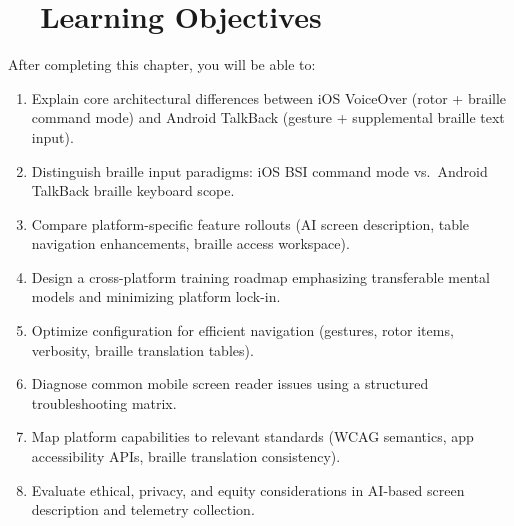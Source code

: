 \section{~~Learning Objectives}
\label{sec:sr26-learning-objectives}
After completing this chapter, you will be able to:
\begin{enumerate}
	\item Explain core architectural differences between iOS VoiceOver (rotor + braille command mode) and Android TalkBack (gesture + supplemental braille text input).
	\item Distinguish braille input paradigms: iOS BSI command mode vs.\ Android TalkBack braille keyboard scope.
	\item Compare platform-specific feature rollouts (AI screen description, table navigation enhancements, braille access workspace).
	\item Design a cross-platform training roadmap emphasizing transferable mental models and minimizing platform lock-in.
	\item Optimize configuration for efficient navigation (gestures, rotor items, verbosity, braille translation tables).
	\item Diagnose common mobile screen reader issues using a structured troubleshooting matrix.
	\item Map platform capabilities to relevant standards (WCAG semantics, app accessibility APIs, braille translation consistency).
	\item Evaluate ethical, privacy, and equity considerations in AI-based screen description and telemetry collection.
\end{enumerate}

